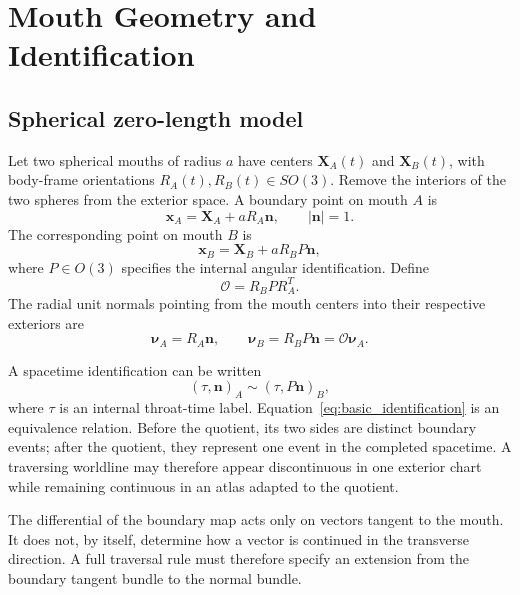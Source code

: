 \documentclass[journal,a4paper]{IEEEtran}
\begin{document}
\section{Mouth Geometry and Identification}
\label{sec:geometry}

\subsection{Spherical zero-length model}

Let two spherical mouths of radius \(a\) have centers \(\mathbf X_A(t)\) and \(\mathbf X_B(t)\), with body-frame orientations \(R_A(t),R_B(t)\in SO(3)\). Remove the interiors of the two spheres from the exterior space. A boundary point on mouth \(A\) is
\begin{equation}
    \mathbf x_A=\mathbf X_A+aR_A\mathbf n,
    \qquad |\mathbf n|=1.
\end{equation}
The corresponding point on mouth \(B\) is
\begin{equation}
    \mathbf x_B=\mathbf X_B+aR_BP\mathbf n,
\end{equation}
where \(P\in O(3)\) specifies the internal angular identification. Define
\begin{equation}
    \mathcal O=R_BPR_A^T.
    \label{eq:relative_orientation}
\end{equation}
The radial unit normals pointing from the mouth centers into their respective exteriors are
\begin{equation}
    \boldsymbol\nu_A=R_A\mathbf n,
    \qquad
    \boldsymbol\nu_B=R_BP\mathbf n
    =\mathcal O\boldsymbol\nu_A.
\end{equation}

A spacetime identification can be written
\begin{equation}
    (\tau,\mathbf n)_A
    \sim
    (\tau,P\mathbf n)_B,
    \label{eq:basic_identification}
\end{equation}
where \(\tau\) is an internal throat-time label. Equation~\eqref{eq:basic_identification} is an equivalence relation. Before the quotient, its two sides are distinct boundary events; after the quotient, they represent one event in the completed spacetime. A traversing worldline may therefore appear discontinuous in one exterior chart while remaining continuous in an atlas adapted to the quotient.

The differential of the boundary map acts only on vectors tangent to the mouth. It does not, by itself, determine how a vector is continued in the transverse direction. A full traversal rule must therefore specify an extension from the boundary tangent bundle to the normal bundle.
\end{document}
